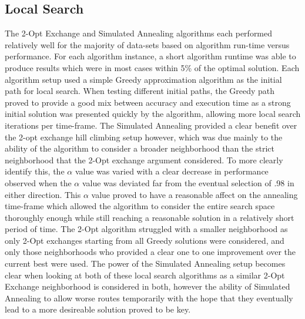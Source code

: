 \documentclass[format=sigconf]{acmart}
\begin{document}
\subsection{Local Search} The 2-Opt Exchange and Simulated Annealing algorithms each performed relatively 
well for the majority of data-sets based on algorithm run-time versus performance. For each algorithm instance, a short
algorithm runtime was able to produce results which were in most cases within 5\% of the optimal solution. Each algorithm setup 
used a simple Greedy approximation algorithm as the initial path for local search. When testing different initial paths, the Greedy path 
proved to provide a good mix between accuracy and execution time as a strong initial solution was presented quickly by the algorithm, allowing more local 
search iterations per time-frame. The Simulated Annealing 
provided a clear benefit over the 2-opt exchange hill climbing setup however, which was due mainly to the ability of the algorithm to consider 
a broader neighborhood than the strict neighborhood that the 2-Opt exchange argument considered. To more clearly identify this, the $\alpha$ value was 
varied with a clear decrease in performance observed when the $\alpha$ value was deviated far from the eventual selection of .98 in either direction. 
This $\alpha$ value proved to have a reasonable affect on the annealing time-frame which allowed the algorithm to consider the entire search space thoroughly enough 
while still reaching a reasonable solution in a relatively short period of time. The 2-Opt algorithm struggled with a smaller neighborhood as only 2-Opt exchanges starting from 
all Greedy solutions were considered, and only those neighborhoods who provided a clear one to one improvement over the current best were used. The power of the Simulated Annealing setup 
becomes clear when looking at both of these local search algorithms as a similar 2-Opt Exchange neighborhood is considered in both, however the ability of Simulated Annealing to 
allow worse routes temporarily with the hope that they eventually lead to a more desireable solution proved to be key.
\end{document}
